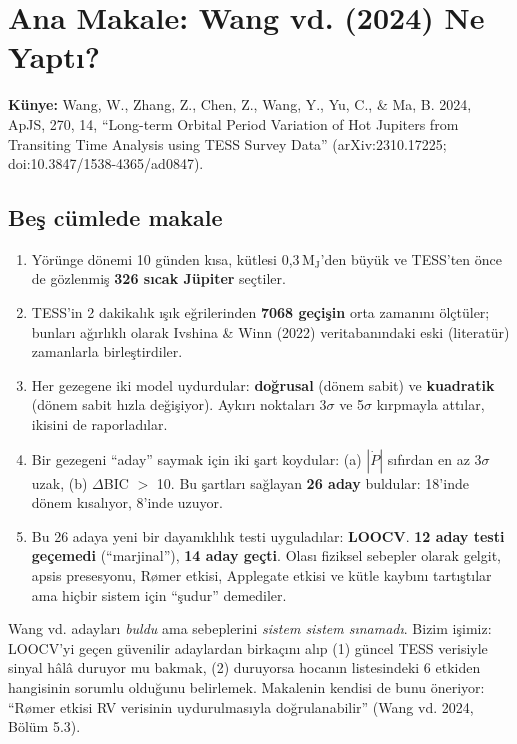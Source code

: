\section{Ana Makale: Wang vd. (2024) Ne Yaptı?}
\label{sec:wang}

\textbf{Künye:} Wang, W., Zhang, Z., Chen, Z., Wang, Y., Yu, C., \& Ma, B. 2024, ApJS, 270, 14,
“Long-term Orbital Period Variation of Hot Jupiters from Transiting Time Analysis using TESS Survey Data”
(arXiv:2310.17225; doi:10.3847/1538-4365/ad0847).

\subsection{Beş cümlede makale}
\begin{enumerate}[leftmargin=*]
\item Yörünge dönemi 10 günden kısa, kütlesi 0,3\,M$_\mathrm{J}$'den büyük ve TESS'ten önce de gözlenmiş
      \textbf{326 sıcak Jüpiter} seçtiler.
\item TESS'in 2 dakikalık ışık eğrilerinden \textbf{7068 geçişin} orta zamanını ölçtüler; bunları ağırlıklı olarak
      Ivshina \& Winn (2022) veritabanındaki eski (literatür) zamanlarla birleştirdiler.
\item Her gezegene iki model uydurdular: \textbf{doğrusal} (dönem sabit) ve \textbf{kuadratik} (dönem sabit hızla
      değişiyor). Aykırı noktaları 3$\sigma$ ve 5$\sigma$ kırpmayla attılar, ikisini de raporladılar.
\item Bir gezegeni “aday” saymak için iki şart koydular: (a) $|\dot P|$ sıfırdan en az 3$\sigma$ uzak,
      (b) $\Delta$BIC $>$ 10. Bu şartları sağlayan \textbf{26 aday} buldular: 18'inde dönem kısalıyor, 8'inde uzuyor.
\item Bu 26 adaya yeni bir dayanıklılık testi uyguladılar: \textbf{LOOCV}. \textbf{12 aday testi geçemedi}
      (“marjinal”), \textbf{14 aday geçti}. Olası fiziksel sebepler olarak gelgit, apsis presesyonu, Rømer etkisi,
      Applegate etkisi ve kütle kaybını tartıştılar ama hiçbir sistem için “şudur” demediler.
\end{enumerate}

\begin{basit}
Wang vd. adayları \emph{buldu} ama sebeplerini \emph{sistem sistem sınamadı}. Bizim işimiz: LOOCV'yi geçen
güvenilir adaylardan birkaçını alıp (1) güncel TESS verisiyle sinyal hâlâ duruyor mu bakmak, (2) duruyorsa
hocanın listesindeki 6 etkiden hangisinin sorumlu olduğunu belirlemek. Makalenin kendisi de bunu öneriyor:
“Rømer etkisi RV verisinin uydurulmasıyla doğrulanabilir” (Wang vd. 2024, Bölüm 5.3).
\end{basit}

